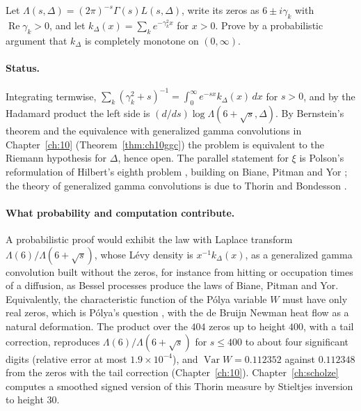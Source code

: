 \begin{problem}\label{op:thorin}
Let $\Lambda(s,\Delta)=(2\pi)^{-s}\Gamma(s)L(s,\Delta)$, write its zeros as $6\pm i\gamma_k$ with $\operatorname{Re}\gamma_k>0$, and let $k_\Delta(x)=\sum_k e^{-\gamma_k^2x}$ for $x>0$. Prove by a probabilistic argument that $k_\Delta$ is completely monotone on $(0,\infty)$.
\end{problem}

\paragraph{Status.} Integrating termwise, $\sum_k(\gamma_k^2+s)^{-1}=\int_0^\infty e^{-sx}k_\Delta(x)\,dx$ for $s>0$, and by the Hadamard product the left side is $(d/ds)\log\Lambda(6+\sqrt s,\Delta)$. By Bernstein's theorem and the equivalence with generalized gamma convolutions in Chapter~\ref{ch:10} (Theorem~\ref{thm:ch10ggc}) the problem is equivalent to the Riemann hypothesis for $\Delta$, hence open. The parallel statement for $\xi$ is Polson's reformulation of Hilbert's eighth problem \cite{polson2017}, building on Biane, Pitman and Yor \cite{bpy2001}; the theory of generalized gamma convolutions is due to Thorin \cite{thorin1977} and Bondesson \cite{bondesson1992}.

\paragraph{What probability and computation contribute.} A probabilistic proof would exhibit the law with Laplace transform $\Lambda(6)/\Lambda(6+\sqrt s)$, whose Lévy density is $x^{-1}k_\Delta(x)$, as a generalized gamma convolution built without the zeros, for instance from hitting or occupation times of a diffusion, as Bessel processes produce the laws of Biane, Pitman and Yor. Equivalently, the characteristic function of the Pólya variable $W$ must have only real zeros, which is Pólya's question \cite{polya1926}, with the de Bruijn Newman heat flow \cite{debruijn1950,newman1976,rodgerstao2020} as a natural deformation. The product over the $404$ zeros up to height $400$, with a tail correction, reproduces $\Lambda(6)/\Lambda(6+\sqrt s)$ for $s\le400$ to about four significant digits (relative error at most $1.9\times10^{-4}$), and $\operatorname{Var}W=0.112352$ against $0.112348$ from the zeros with the tail correction (Chapter~\ref{ch:10}). Chapter~\ref{ch:scholze} computes a smoothed signed version of this Thorin measure by Stieltjes inversion to height $30$.

